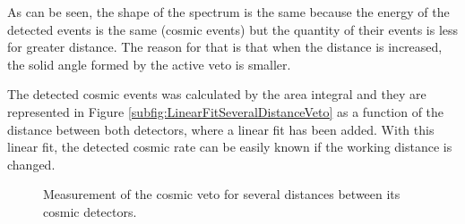 
As can be seen, the shape of the spectrum is the same because the energy of the detected events is the same (cosmic events) but the quantity of their events is less for greater distance. The reason for that is that when the distance is increased, the solid angle formed by the active veto is smaller.

The detected cosmic events was calculated by the area integral and they are represented in Figure \ref{subfig:LinearFitSeveralDistanceVeto} as a function of the distance between both detectors, where a linear fit has been added. With this linear fit, the detected cosmic rate can be easily known if the working distance is changed. 



\begin{figure}[htbp]
 \centering
    \newline
 \caption{Measurement of the cosmic veto for several distances between its cosmic detectors.}
 \label{fig:DistanceVeto}
\end{figure}




